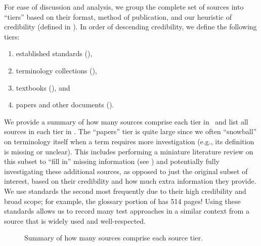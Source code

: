 For ease of discussion and analysis, we group the complete set of sources into
``tiers'' based on their format, method of publication, and our heuristic of
credibility (defined in ). In order of descending credibility, we
define the following tiers:
\begin{enumerate}
    \item established standards (),
    \item terminology collections (),
    \item textbooks (), and
    \item papers and other documents ().
\end{enumerate}
We provide a summary of how many sources comprise each tier in
\ifnotpaper\ and list all sources in each tier
    in \fi. The ``papers'' tier is quite large since we
often ``snowball'' on terminology itself when a term requires more
investigation (e.g., its definition is missing or unclear). This includes
performing a miniature literature review on this subset to ``fill in'' missing
information (see ) and potentially fully investigating these
additional sources, as opposed to just the original subset of interest,
based on their credibility and how much extra information they provide.
We use standards the second most frequently due to their high credibility and
broad scope; for example, the glossary portion of \citet{IEEE2017} has 514
pages! Using these standards allows us to record many test approaches in a
similar context from a source that is widely used and well-respected.

\begin{figure}[bt!]
    \centering
    \caption{Summary of how many sources comprise each source tier.}
    \label{fig:sourceSummary}
\end{figure}

\subsubsection{}\label{stds}


